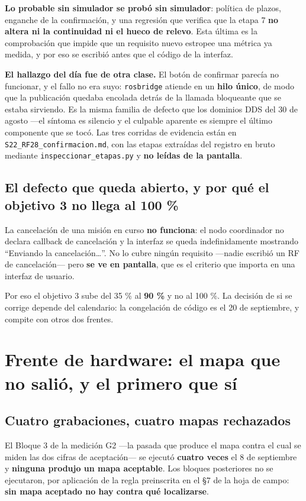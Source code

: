 \documentclass[12pt,letterpaper]{article}
\begin{document}
\textbf{Lo probable sin simulador se probó sin simulador}: política de plazos, enganche de la confirmación, y una regresión que verifica que la etapa 7 \textbf{no altera ni la continuidad ni el hueco de relevo}. Esta última es la comprobación que impide que un requisito nuevo estropee una métrica ya medida, y por eso se escribió antes que el código de la interfaz.

\textbf{El hallazgo del día fue de otra clase.} El botón de confirmar parecía no funcionar, y el fallo no era suyo: \texttt{rosbridge} atiende en un \textbf{hilo único}, de modo que la publicación quedaba encolada detrás de la llamada bloqueante que se estaba sirviendo. Es la misma familia de defecto que los dominios DDS del 30 de agosto ---el síntoma es silencio y el culpable aparente es siempre el último componente que se tocó. Las tres corridas de evidencia están en \texttt{S22\_RF28\_confirmacion.md}, con las etapas extraídas del registro en bruto mediante \texttt{inspeccionar\_etapas.py} y \textbf{no leídas de la pantalla}.

\subsection{El defecto que queda abierto, y por qué el objetivo 3 no llega al 100 \%}

La cancelación de una misión en curso \textbf{no funciona}: el nodo coordinador no declara callback de cancelación y la interfaz se queda indefinidamente mostrando ``Enviando la cancelación\ldots''. No lo cubre ningún requisito ---nadie escribió un RF de cancelación--- pero \textbf{se ve en pantalla}, que es el criterio que importa en una interfaz de usuario.

Por eso el objetivo 3 sube del 35 \% al \textbf{90 \%} y no al 100 \%. La decisión de si se corrige depende del calendario: la congelación de código es el 20 de septiembre, y compite con otros dos frentes.

\section{Frente de hardware: el mapa que no salió, y el primero que sí}
\label{sec:mapeo}

\subsection{Cuatro grabaciones, cuatro mapas rechazados}

El Bloque 3 de la medición G2 ---la pasada que produce el mapa contra el cual se miden las dos cifras de aceptación--- se ejecutó \textbf{cuatro veces} el 8 de septiembre y \textbf{ninguna produjo un mapa aceptable}. Los bloques posteriores no se ejecutaron, por aplicación de la regla preinscrita en el \S 7 de la hoja de campo: \textbf{sin mapa aceptado no hay contra qué localizarse}.
\end{document}
